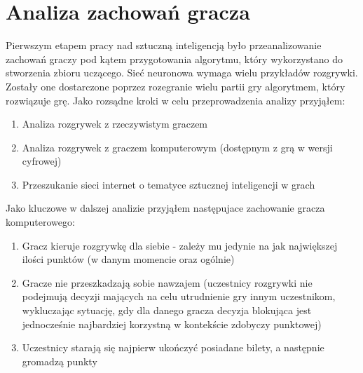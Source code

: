 \documentclass[12pt, oneside]{report}
\begin{document}
	\section{Analiza zachowań gracza}
	Pierwszym etapem pracy nad sztuczną inteligencją było przeanalizowanie zachowań graczy pod kątem przygotowania algorytmu, który wykorzystano do stworzenia zbioru uczącego. Sieć neuronowa wymaga wielu przykładów rozgrywki. Zostały one dostarczone poprzez rozegranie wielu partii gry algorytmem, który rozwiązuje grę. Jako rozsądne kroki w celu przeprowadzenia analizy przyjąłem:
	\begin{enumerate}
		\item{Analiza rozgrywek z rzeczywistym graczem}
		\item{Analiza rozgrywek z graczem komputerowym (dostępnym z grą w wersji cyfrowej)}
		\item{Przeszukanie sieci internet o tematyce sztucznej inteligencji w grach}
	\end{enumerate}
	Jako kluczowe w dalszej analizie przyjąłem następujace zachowanie gracza komputerowego:
	\begin{enumerate}
		\item Gracz kieruje rozgrywkę dla siebie - zależy mu jedynie na jak największej ilości punktów (w danym momencie oraz ogólnie)
		\item Gracze nie przeszkadzają sobie nawzajem (uczestnicy rozgrywki nie podejmują decyzji mających na celu utrudnienie gry innym uczestnikom, wykluczając sytuację, gdy dla danego gracza decyzja blokująca jest jednocześnie najbardziej korzystną w kontekście zdobyczy punktowej)
		\item Uczestnicy starają się najpierw ukończyć posiadane bilety, a następnie gromadzą punkty
	\end{enumerate}
\end{document}
